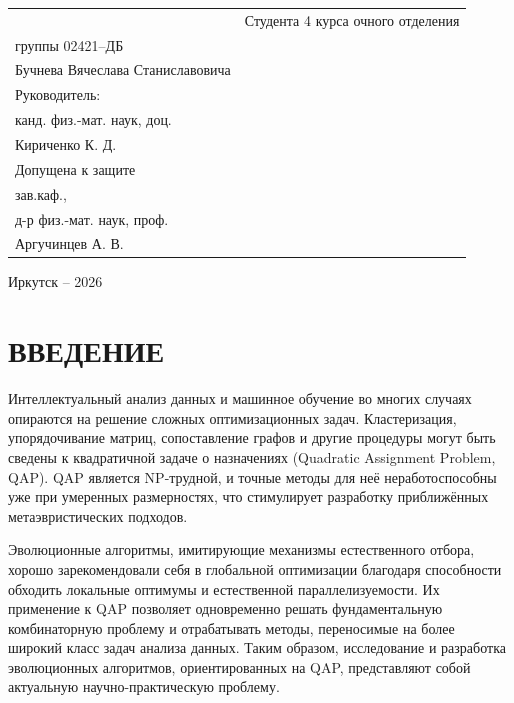 \documentclass[732]{studrep}
\theoremstyle{nonumberplain}
\begin{document}
\noindent\begin{tabularx}{\textwidth} {
  >{\raggedright\arraybackslash}X
  >{\raggedright}X }
&
Студента 4 курса очного отделения\\
группы 02421--ДБ\\
Бучнева Вячеслава Станиславовича\\[2em]

Руководитель:\\ %
канд. физ.-мат. наук, доц.\\[0.5em]
\underline{\hspace{3cm}} Кириченко К. Д. \\[2em]

Допущена к защите\\
зав.каф.,\\
д-р физ.-мат. наук, проф.\\
\underline{\hspace{3cm}} Аргучинцев А. В.\\[2em]

\end{tabularx}
\vfill
\begin{center}
  Иркутск -- 2026
\end{center}
\clearpage

\tableofcontents

\chapter*{ВВЕДЕНИЕ}
\label{chap:intro}

Интеллектуальный анализ данных и машинное обучение во многих случаях опираются на решение сложных оптимизационных задач. Кластеризация, упорядочивание матриц, сопоставление графов и другие процедуры могут быть сведены к квадратичной задаче о назначениях (Quadratic Assignment Problem, QAP). QAP является NP-трудной, и точные методы для неё неработоспособны уже при умеренных размерностях, что стимулирует разработку приближённых метаэвристических подходов.

Эволюционные алгоритмы, имитирующие механизмы естественного отбора, хорошо зарекомендовали себя в глобальной оптимизации благодаря способности обходить локальные оптимумы и естественной параллелизуемости. Их применение к QAP позволяет одновременно решать фундаментальную комбинаторную проблему и отрабатывать методы, переносимые на более широкий класс задач анализа данных. Таким образом, исследование и разработка эволюционных алгоритмов, ориентированных на QAP, представляют собой актуальную научно-практическую проблему.
\end{document}
